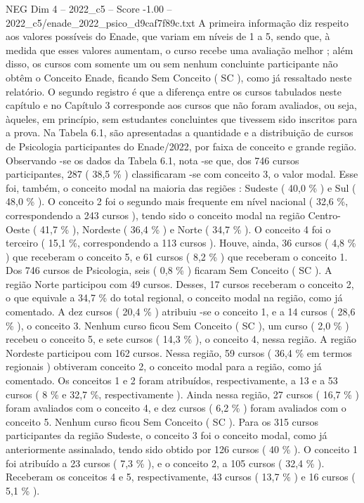 \begin{textsample}{NEG Dim 4 – 2022\_c5 – Score -1.00 – 2022\_c5/enade\_2022\_psico\_d9caf7f89c.txt}
A primeira informação diz respeito aos valores possíveis do Enade, que variam em níveis de 1 a 5, sendo que, à medida que esses valores aumentam, o curso recebe uma avaliação melhor ; além disso, os cursos com somente um ou sem nenhum concluinte participante não obtêm o Conceito Enade, ficando Sem Conceito ( SC ), como já ressaltado neste relatório.
O segundo registro é que a diferença entre os cursos tabulados neste capítulo e no Capítulo 3 corresponde aos cursos que não foram avaliados, ou seja, àqueles, em princípio, sem estudantes concluintes que tivessem sido inscritos para a prova.
Na Tabela 6.1, são apresentadas a quantidade e a distribuição de cursos de Psicologia participantes do Enade/2022, por faixa de conceito e grande região.
Observando -se os dados da Tabela 6.1, nota -se que, dos 746 cursos participantes, 287 ( 38,5 \% ) classificaram -se com conceito 3, o valor modal.
Esse foi, também, o conceito modal na maioria das regiões : Sudeste ( 40,0 \% ) e Sul ( 48,0 \% ).
O conceito 2 foi o segundo mais frequente em nível nacional ( 32,6 \%, correspondendo a 243 cursos ), tendo sido o conceito modal na região Centro-Oeste ( 41,7 \% ), Nordeste ( 36,4 \% ) e Norte ( 34,7 \% ).
O conceito 4 foi o terceiro ( 15,1 \%, correspondendo a 113 cursos ).
Houve, ainda, 36 cursos ( 4,8 \% ) que receberam o conceito 5, e 61 cursos ( 8,2 \% ) que receberam o conceito 1.
Dos 746 cursos de Psicologia, seis ( 0,8 \% ) ficaram Sem Conceito ( SC ).
A região Norte participou com 49 cursos.
Desses, 17 cursos receberam o conceito 2, o que equivale a 34,7 \% do total regional, o conceito modal na região, como já comentado.
A dez cursos ( 20,4 \% ) atribuiu -se o conceito 1, e a 14 cursos ( 28,6 \% ), o conceito 3.
Nenhum curso ficou Sem Conceito ( SC ), um curso ( 2,0 \% ) recebeu o conceito 5, e sete cursos ( 14,3 \% ), o conceito 4, nessa região.
A região Nordeste participou com 162 cursos.
Nessa região, 59 cursos ( 36,4 \% em termos regionais ) obtiveram conceito 2, o conceito modal para a região, como já comentado.
Os conceitos 1 e 2 foram atribuídos, respectivamente, a 13 e a 53 cursos ( 8 \% e 32,7 \%, respectivamente ).
Ainda nessa região, 27 cursos ( 16,7 \% ) foram avaliados com o conceito 4, e dez cursos ( 6,2 \% ) foram avaliados com o conceito 5.
Nenhum curso ficou Sem Conceito ( SC ).
Para os 315 cursos participantes da região Sudeste, o conceito 3 foi o conceito modal, como já anteriormente assinalado, tendo sido obtido por 126 cursos ( 40 \% ).
O conceito 1 foi atribuído a 23 cursos ( 7,3 \% ), e o conceito 2, a 105 cursos ( 32,4 \% ).
Receberam os conceitos 4 e 5, respectivamente, 43 cursos ( 13,7 \% ) e 16 cursos ( 5,1 \% ).

\end{textsample}
